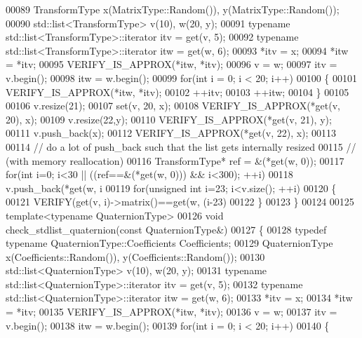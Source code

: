 \begin{DoxyCode}
00089   TransformType x(MatrixType::Random()), y(MatrixType::Random());
00090   std::list<TransformType> v(10), w(20, y);
00091   \textcolor{keyword}{typename} std::list<TransformType>::iterator itv = \textcolor{keyword}{get}(v, 5);
00092   \textcolor{keyword}{typename} std::list<TransformType>::iterator itw = \textcolor{keyword}{get}(w, 6);
00093   *itv = x;
00094   *itw = *itv;
00095   VERIFY\_IS\_APPROX(*itw, *itv);
00096   v = w;
00097   itv = v.begin();
00098   itw = w.begin();
00099   \textcolor{keywordflow}{for}(\textcolor{keywordtype}{int} i = 0; i < 20; i++)
00100   \{
00101     VERIFY\_IS\_APPROX(*itw, *itv);
00102     ++itv;
00103     ++itw;
00104   \}
00105 
00106   v.resize(21);
00107   \textcolor{keyword}{set}(v, 20, x);
00108   VERIFY\_IS\_APPROX(*\textcolor{keyword}{get}(v, 20), x);
00109   v.resize(22,y);
00110   VERIFY\_IS\_APPROX(*\textcolor{keyword}{get}(v, 21), y);
00111   v.push\_back(x);
00112   VERIFY\_IS\_APPROX(*\textcolor{keyword}{get}(v, 22), x);
00113 
00114   \textcolor{comment}{// do a lot of push\_back such that the list gets internally resized}
00115   \textcolor{comment}{// (with memory reallocation)}
00116   TransformType* ref = &(*\textcolor{keyword}{get}(w, 0));
00117   \textcolor{keywordflow}{for}(\textcolor{keywordtype}{int} i=0; i<30 || ((ref==&(*\textcolor{keyword}{get}(w, 0))) && i<300); ++i)
00118     v.push\_back(*\textcolor{keyword}{get}(w, i%
00119   \textcolor{keywordflow}{for}(\textcolor{keywordtype}{unsigned} \textcolor{keywordtype}{int} i=23; i<v.size(); ++i)
00120   \{
00121     VERIFY(\textcolor{keyword}{get}(v, i)->matrix()==\textcolor{keyword}{get}(w, (i-23)%
00122   \}
00123 \}
00124 
00125 \textcolor{keyword}{template}<\textcolor{keyword}{typename} QuaternionType>
00126 \textcolor{keywordtype}{void} check\_stdlist\_quaternion(\textcolor{keyword}{const} QuaternionType&)
00127 \{
00128   \textcolor{keyword}{typedef} \textcolor{keyword}{typename} QuaternionType::Coefficients Coefficients;
00129   QuaternionType x(Coefficients::Random()), y(Coefficients::Random());
00130   std::list<QuaternionType> v(10), w(20, y);
00131   \textcolor{keyword}{typename} std::list<QuaternionType>::iterator itv = \textcolor{keyword}{get}(v, 5);
00132   \textcolor{keyword}{typename} std::list<QuaternionType>::iterator itw = \textcolor{keyword}{get}(w, 6);
00133   *itv = x;
00134   *itw = *itv;
00135   VERIFY\_IS\_APPROX(*itw, *itv);
00136   v = w;
00137   itv = v.begin();
00138   itw = w.begin();
00139   \textcolor{keywordflow}{for}(\textcolor{keywordtype}{int} i = 0; i < 20; i++)
00140   \{

\end{DoxyCode}
